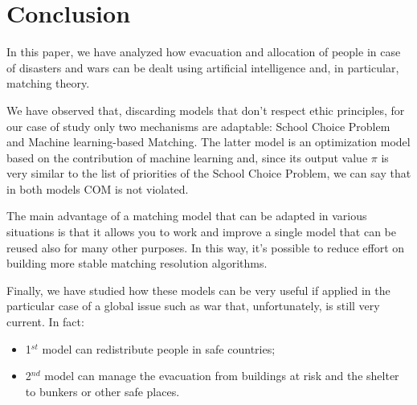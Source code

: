 \section{Conclusion}
In this paper, we have analyzed how evacuation and allocation of people in case of disasters and wars can be dealt using artificial intelligence and, in particular, matching theory.

We have observed that, discarding models that don’t respect ethic principles, for our case of study only two mechanisms are adaptable: School Choice Problem and Machine learning-based Matching. The latter model is an optimization model based on the contribution of machine learning and, since its output value \(\pi\) is very similar to the list of priorities of the School Choice Problem, we can say that in both models COM is not violated.

The main advantage of a matching model that can be adapted in various situations is that it allows you to work and improve a single model that can be reused also for many other purposes. In this way, it’s possible to reduce effort on building more stable matching resolution algorithms.

Finally, we have studied how these models can be very useful if applied in the particular case of a global issue such as war that, unfortunately, is still very current. In fact:
\begin{itemize}
    \item 1\(^{st}\) model can redistribute people in safe countries;
    \item 2\(^{nd}\) model can manage the evacuation from buildings at risk and the shelter to bunkers or other safe places.
\end{itemize}
